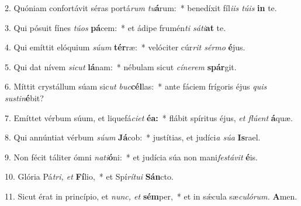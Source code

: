 \item 2. Quóniam confortávit séras portá\textit{rum tu}\textbf{á}rum:~* benedíxit fíl\textit{iis túis} \textbf{in} te.

\item 3. Qui pósuit fínes \textit{túos} \textbf{pá}cem:~* et ádipe frumén\textit{ti sáti}\textbf{at} te.

\item 4. Qui emíttit elóquium \textit{súum} \textbf{tér}ræ:~* velóciter cúr\textit{rit sérmo} \textbf{é}jus.

\item 5. Qui dat nívem \textit{sicut} \textbf{lá}nam:~* nébulam sicut \textit{cínerem} \textbf{spár}git.

\item 6. Míttit crystállum súam sic\textit{ut buc}\textbf{cél}las:~* ante fáciem frígoris éjus \textit{quis sustin}\textbf{é}bit?

\item 7. Emíttet vérbum súum, et liquefá\textit{ciet} \textbf{éa:}~* flábit spíritus éjus, \textit{et flúent} \textbf{á}quæ.

\item 8. Qui annúntiat vérbum \textit{súum} \textbf{Já}cob:~* justítias, et judíci\textit{a súa} \textbf{Is}rael.

\item 9. Non fécit táliter ómni \textit{nati}\textbf{ó}ni:~* et judícia súa non mani\textit{festávit} \textbf{é}is.

\item 10. Glória Pá\textit{tri, et} \textbf{Fí}lio,~* et Spí\textit{rítui} \textbf{Sán}cto.

\item 11. Sicut érat in princípio, et \textit{nunc, et} \textbf{sém}per,~* et in sǽcula sæ\textit{culórum.} \textbf{A}men.

